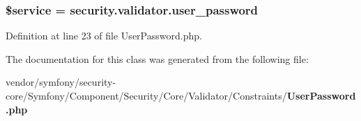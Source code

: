 \subsubsection[{\$service}]{\setlength{\rightskip}{0pt plus 5cm}\$service = \textquotesingle{}security.\+validator.\+user\+\_\+password\textquotesingle{}}\label{class_symfony_1_1_component_1_1_security_1_1_core_1_1_validator_1_1_constraints_1_1_user_password_abb8d1943d2cf9b6a3d54a4fed1ad2d9d}


Definition at line 23 of file User\+Password.\+php.



The documentation for this class was generated from the following file\+:\begin{DoxyCompactItemize}
\item 
vendor/symfony/security-\/core/\+Symfony/\+Component/\+Security/\+Core/\+Validator/\+Constraints/{\bf User\+Password.\+php}\end{DoxyCompactItemize}
